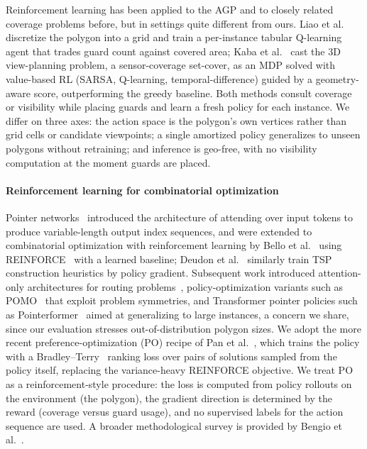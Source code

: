 \documentclass[11pt]{article}
\begin{document}
Reinforcement learning has been applied to the AGP and to closely related coverage problems before, but in settings quite different from ours. Liao et al.~\cite{Liao2025AGPRL} discretize the polygon into a grid and train a per-instance tabular Q-learning agent that trades guard count against covered area; Kaba et al.~\cite{Kaba2016ViewPlanning} cast the 3D view-planning problem, a sensor-coverage set-cover, as an MDP solved with value-based RL (SARSA, Q-learning, temporal-difference) guided by a geometry-aware score, outperforming the greedy baseline. Both methods consult coverage or visibility while placing guards and learn a fresh policy for each instance. We differ on three axes: the action space is the polygon's own vertices rather than grid cells or candidate viewpoints; a single amortized policy generalizes to unseen polygons without retraining; and inference is geo-free, with no visibility computation at the moment guards are placed.

\paragraph{Reinforcement learning for combinatorial optimization} Pointer networks~\cite{Vinyals2015} introduced the architecture of attending over input tokens to produce variable-length output index sequences, and were extended to combinatorial optimization with reinforcement learning by Bello et al.~\cite{Bello2016} using REINFORCE~\cite{Williams1992} with a learned baseline; Deudon et al.~\cite{Deudon2018TSP} similarly train TSP construction heuristics by policy gradient. Subsequent work introduced attention-only architectures for routing problems~\cite{Kool2019Attention}, policy-optimization variants such as POMO~\cite{Kwon2020POMO} that exploit problem symmetries, and Transformer pointer policies such as Pointerformer~\cite{Jin2023Pointerformer} aimed at generalizing to large instances, a concern we share, since our evaluation stresses out-of-distribution polygon sizes. We adopt the more recent preference-optimization (PO) recipe of Pan et al.~\cite{Pan2025PO}, which trains the policy with a Bradley--Terry~\cite{BradleyTerry1952} ranking loss over pairs of solutions sampled from the policy itself, replacing the variance-heavy REINFORCE objective. We treat PO as a reinforcement-style procedure: the loss is computed from policy rollouts on the environment (the polygon), the gradient direction is determined by the reward (coverage versus guard usage), and no supervised labels for the action sequence are used. A broader methodological survey is provided by Bengio et al.~\cite{survey:BENGIO2021405}.
\end{document}
